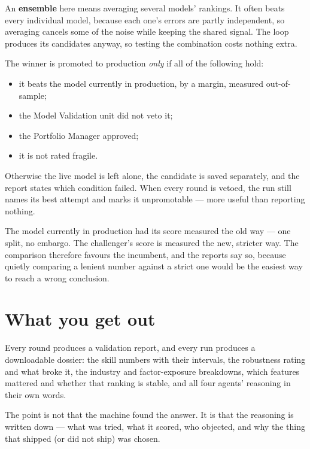 \documentclass[11pt]{article}
\begin{document}
\begin{specbox}
An \textbf{ensemble} here means averaging several models' rankings. It often beats every
individual model, because each one's errors are partly independent, so averaging cancels
some of the noise while keeping the shared signal. The loop produces its candidates
anyway, so testing the combination costs nothing extra.
\end{specbox}

The winner is promoted to production \emph{only} if all of the following hold:

\begin{itemize}
  \item it beats the model currently in production, by a margin, measured out-of-sample;
  \item the Model Validation unit did not veto it;
  \item the Portfolio Manager approved;
  \item it is not rated fragile.
\end{itemize}

Otherwise the live model is left alone, the candidate is saved separately, and the
report states which condition failed. When every round is vetoed, the run still names
its best attempt and marks it unpromotable --- more useful than reporting nothing.

\begin{notebox}
The model currently in production had its score measured the old way --- one split, no
embargo. The challenger's score is measured the new, stricter way. The comparison
therefore favours the incumbent, and the reports say so, because quietly comparing a
lenient number against a strict one would be the easiest way to reach a wrong
conclusion.
\end{notebox}

\section{What you get out}

Every round produces a validation report, and every run produces a downloadable
dossier: the skill numbers with their intervals, the robustness rating and what broke
it, the industry and factor-exposure breakdowns, which features mattered and whether
that ranking is stable, and all four agents' reasoning in their own words.

The point is not that the machine found the answer. It is that the reasoning is written
down --- what was tried, what it scored, who objected, and why the thing that shipped
(or did not ship) was chosen.
\end{document}
